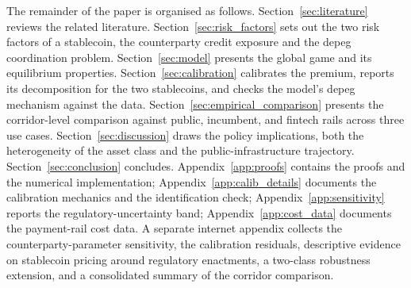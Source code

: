 The remainder of the paper is organised as follows. Section~\ref{sec:literature} reviews the related literature. Section~\ref{sec:risk_factors} sets out the two risk factors of a stablecoin, the counterparty credit exposure and the depeg coordination problem. Section~\ref{sec:model} presents the global game and its equilibrium properties. Section~\ref{sec:calibration} calibrates the premium, reports its decomposition for the two stablecoins, and checks the model's depeg mechanism against the data. Section~\ref{sec:empirical_comparison} presents the corridor-level comparison against public, incumbent, and fintech rails across three use cases. Section~\ref{sec:discussion} draws the policy implications, both the heterogeneity of the asset class and the public-infrastructure trajectory. Section~\ref{sec:conclusion} concludes. Appendix~\ref{app:proofs} contains the proofs and the numerical implementation; Appendix~\ref{app:calib_details} documents the calibration mechanics and the identification check; Appendix~\ref{app:sensitivity} reports the regulatory-uncertainty band; Appendix~\ref{app:cost_data} documents the payment-rail cost data. A separate internet appendix collects the counterparty-parameter sensitivity, the calibration residuals, descriptive evidence on stablecoin pricing around regulatory enactments, a two-class robustness extension, and a consolidated summary of the corridor comparison.
